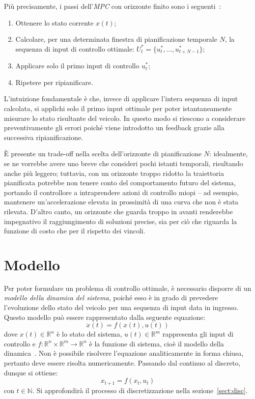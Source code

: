 Più precisamente, i passi dell’\textit{MPC} con orizzonte finito sono i seguenti~\cite{mpcpeters}:
\begin{enumerate}
    \item Ottenere lo stato corrente $x(t)$;
    \item Calcolare, per una determinata finestra di pianificazione 
    temporale $N$, la sequenza di input di controllo ottimale: 
    $U^*_{t} = \{u^*_{t},\dots, u^*_{t+N-1}\}$;
    \item Applicare solo il primo input di controllo $u^*_{t}$;
    \item Ripetere per ripianificare.
\end{enumerate}
L'intuizione fondamentale è che, invece di applicare l'intera sequenza di input calcolata, si 
applichi solo il primo input ottimale per poter istantaneamente misurare lo stato risultante del veicolo. 
In questo modo si riescono a considerare preventivamente gli errori poiché viene introdotto un
feedback grazie alla successiva ripianificazione.

È presente un trade-off nella scelta dell'orizzonte di pianificazione $N$: idealmente, se ne 
vorrebbe avere uno breve che consideri pochi istanti temporali, risultando anche più leggero; 
tuttavia, con un orizzonte troppo ridotto la traiettoria pianificata potrebbe non tenere conto del 
comportamento futuro del sistema, portando il controllore a intraprendere azioni di controllo 
miopi -- ad esempio, mantenere un'accelerazione elevata in prossimità di una curva che non è stata rilevata.
D'altro canto, un orizzonte che guarda troppo in avanti renderebbe impegnativo il raggiungimento
di soluzioni precise, sia per ciò che riguarda la funzione di costo che per il rispetto dei vincoli.

\section{Modello}
Per poter formulare un problema di controllo ottimale, è necessario disporre di un 
\textit{modello della dinamica del sistema}, poiché esso è in grado di prevedere l'evoluzione 
dello stato del veicolo per una sequenza di input data in ingresso.
Questo modello può essere rappresentato dalla seguente equazione:
\[ \dot{x}(t) = f(x(t), u(t)) \]
dove $x(t) \in \mathbb{R}^n$ è lo stato del sistema, 
$u(t) \in \mathbb{R}^m$ rappresenta gli input di controllo e 
$f : \mathbb{R}^n \times \mathbb{R}^m \rightarrow \mathbb{R}^n$ è 
la funzione di sistema, cioè il modello della dinamica~\cite{f1tenthcoursel13}. 
Non è possibile risolvere l'equazione analiticamente in forma chiusa, 
pertanto deve essere risolta numericamente. Passando dal continuo al
discreto, dunque si ottiene:
\[ x_{t+1} = f(x_t, u_t) \]
con $t \in \mathbb{N} $. Si approfondirà il processo di discretizzazione nella sezione~\ref{sect:disc}.


